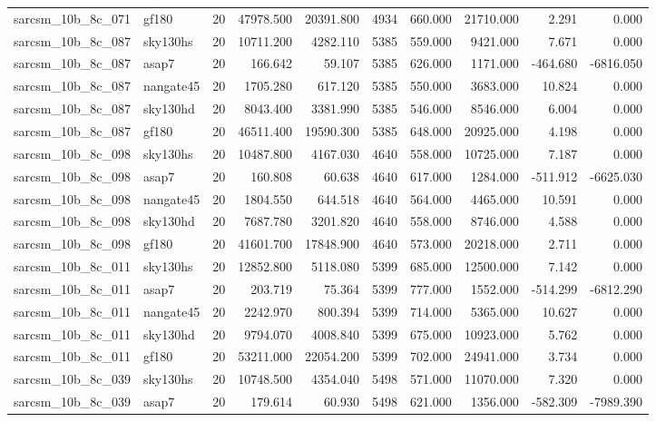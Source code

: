 \documentclass{article}
\begin{document}
\begin{longtable}{llrrrrrrrr}
sarcsm\_10b\_8c\_071 & gf180 & 20 & 47978.500 & 20391.800 & 4934 & 660.000 & 21710.000 & 2.291 & 0.000 \\
sarcsm\_10b\_8c\_087 & sky130hs & 20 & 10711.200 & 4282.110 & 5385 & 559.000 & 9421.000 & 7.671 & 0.000 \\
sarcsm\_10b\_8c\_087 & asap7 & 20 & 166.642 & 59.107 & 5385 & 626.000 & 1171.000 & -464.680 & -6816.050 \\
sarcsm\_10b\_8c\_087 & nangate45 & 20 & 1705.280 & 617.120 & 5385 & 550.000 & 3683.000 & 10.824 & 0.000 \\
sarcsm\_10b\_8c\_087 & sky130hd & 20 & 8043.400 & 3381.990 & 5385 & 546.000 & 8546.000 & 6.004 & 0.000 \\
sarcsm\_10b\_8c\_087 & gf180 & 20 & 46511.400 & 19590.300 & 5385 & 648.000 & 20925.000 & 4.198 & 0.000 \\
sarcsm\_10b\_8c\_098 & sky130hs & 20 & 10487.800 & 4167.030 & 4640 & 558.000 & 10725.000 & 7.187 & 0.000 \\
sarcsm\_10b\_8c\_098 & asap7 & 20 & 160.808 & 60.638 & 4640 & 617.000 & 1284.000 & -511.912 & -6625.030 \\
sarcsm\_10b\_8c\_098 & nangate45 & 20 & 1804.550 & 644.518 & 4640 & 564.000 & 4465.000 & 10.591 & 0.000 \\
sarcsm\_10b\_8c\_098 & sky130hd & 20 & 7687.780 & 3201.820 & 4640 & 558.000 & 8746.000 & 4.588 & 0.000 \\
sarcsm\_10b\_8c\_098 & gf180 & 20 & 41601.700 & 17848.900 & 4640 & 573.000 & 20218.000 & 2.711 & 0.000 \\
sarcsm\_10b\_8c\_011 & sky130hs & 20 & 12852.800 & 5118.080 & 5399 & 685.000 & 12500.000 & 7.142 & 0.000 \\
sarcsm\_10b\_8c\_011 & asap7 & 20 & 203.719 & 75.364 & 5399 & 777.000 & 1552.000 & -514.299 & -6812.290 \\
sarcsm\_10b\_8c\_011 & nangate45 & 20 & 2242.970 & 800.394 & 5399 & 714.000 & 5365.000 & 10.627 & 0.000 \\
sarcsm\_10b\_8c\_011 & sky130hd & 20 & 9794.070 & 4008.840 & 5399 & 675.000 & 10923.000 & 5.762 & 0.000 \\
sarcsm\_10b\_8c\_011 & gf180 & 20 & 53211.000 & 22054.200 & 5399 & 702.000 & 24941.000 & 3.734 & 0.000 \\
sarcsm\_10b\_8c\_039 & sky130hs & 20 & 10748.500 & 4354.040 & 5498 & 571.000 & 11070.000 & 7.320 & 0.000 \\
sarcsm\_10b\_8c\_039 & asap7 & 20 & 179.614 & 60.930 & 5498 & 621.000 & 1356.000 & -582.309 & -7989.390 \\

\end{longtable}
\end{document}
